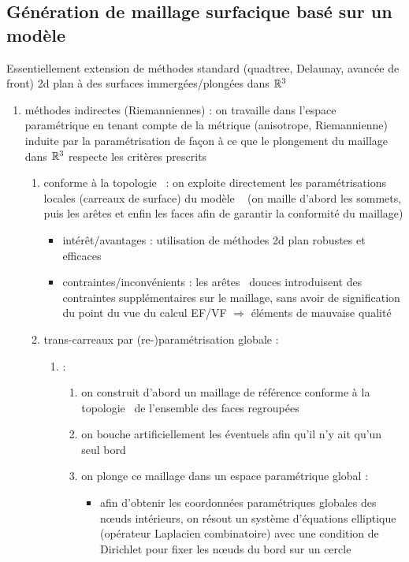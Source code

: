 \subsection{Génération de maillage surfacique basé sur un modèle \brep}
Essentiellement extension de méthodes standard (\ie quadtree, Delaunay, avancée de front) 2d plan à des surfaces immergées/plongées dans $\mathbb{R}^3$
\begin{enumerate}
	\item méthodes indirectes (Riemanniennes) : on travaille dans l'espace paramétrique en tenant compte de la métrique (anisotrope, Riemannienne) induite par la paramétrisation de façon à ce que le plongement du maillage dans $\mathbb{R}^3$ respecte les critères prescrits
	\begin{enumerate}
		\item conforme à la topologie \brep\ : on exploite directement les paramétrisations locales (carreaux de surface) du modèle \brep\ \cite{borouchaki2000} (on maille d'abord les sommets, puis les arêtes et enfin les faces afin de garantir la conformité du maillage)
		\begin{itemize}
			\item intérêt/avantages : utilisation de méthodes 2d plan robustes et efficaces
			\item contraintes/inconvénients : les arêtes \brep\ douces introduisent des contraintes supplémentaires sur le maillage, sans avoir de signification du point du vue du calcul EF/VF $\Rightarrow$ éléments de mauvaise qualité
		\end{itemize}
		\item trans-carreaux par (re-)paramétrisation globale : 
			\begin{enumerate}
				\item \cite{marcum1999} :
				\begin{enumerate}
					\item on construit d'abord un maillage de référence conforme à la topologie \brep\ de l'ensemble des faces regroupées
					\item \label{item:bouche_trous} on bouche artificiellement les éventuels  afin qu'il n'y ait qu'un seul bord
					\item on plonge ce maillage dans un espace paramétrique global :
					\begin{itemize}
						\item afin d'obtenir les coordonnées paramétriques globales des n\oe uds intérieurs, on résout un système d'équations elliptique (opérateur Laplacien combinatoire) avec une condition de Dirichlet pour fixer les n\oe uds du bord sur un cercle

\end{itemize}
\end{enumerate}
\end{enumerate}
\end{enumerate}
\end{enumerate}
